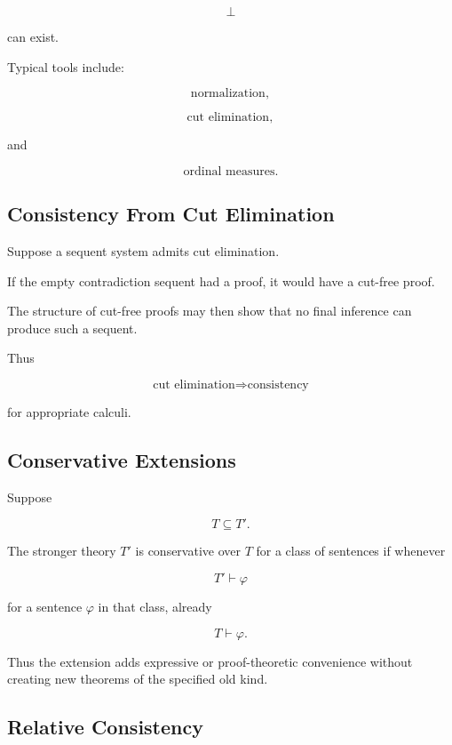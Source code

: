 \[
\bot
\]

can exist.

Typical tools include:

\[
\boxed{
\text{normalization},
}
\]

\[
\boxed{
\text{cut elimination},
}
\]

and

\[
\boxed{
\text{ordinal measures}.
}
\]

\subsection{Consistency From Cut Elimination}
\label{subsec:consistency-cut-elimination}

Suppose a sequent system admits cut elimination.

If the empty contradiction sequent had a proof, it would have a cut-free
proof.

The structure of cut-free proofs may then show that no final inference can
produce such a sequent.

Thus

\[
\boxed{
\text{cut elimination}
\Longrightarrow
\text{consistency}
}
\]

for appropriate calculi.

\subsection{Conservative Extensions}
\label{subsec:conservative-extensions}

Suppose

\[
T\subseteq T'.
\]

The stronger theory \(T'\) is conservative over \(T\) for a class of
sentences if whenever

\[
T'\vdash\varphi
\]

for a sentence \(\varphi\) in that class, already

\[
\boxed{
T\vdash\varphi.
}
\]

Thus the extension adds expressive or proof-theoretic convenience without
creating new theorems of the specified old kind.

\subsection{Relative Consistency}
\label{subsec:proof-theoretic-relative-consistency}

